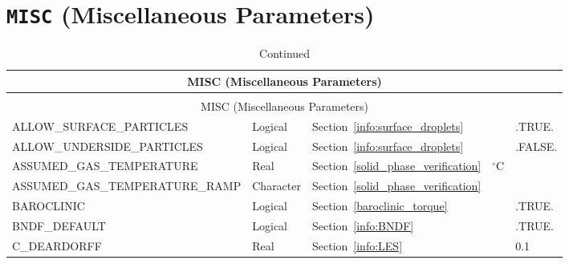 \documentclass[11pt]{book}
\begin{document}
\vspace{\baselineskip}



\section{\texorpdfstring{{\tt MISC}}{MISC} (Miscellaneous Parameters)}


\begin{longtable}{@{\extracolsep{\fill}}|l|l|l|l|l|}
\caption[Miscellaneous parameters ({\ct MISC} namelist group)]{For more information see Section~\ref{info:MISC}.}
\label{tbl:MISC} \\
\hline
\multicolumn{5}{|c|}{{\ct MISC} (Miscellaneous Parameters)} \\
\hline \hline
\endfirsthead
\caption[]{Continued} \\
\hline
\multicolumn{5}{|c|}{{\ct MISC} (Miscellaneous Parameters)} \\
\hline \hline
\endhead
{\ct \footnotesize ALLOW\_SURFACE\_PARTICLES}   & Logical       & Section~\ref{info:surface_droplets}                   &               & {\ct .TRUE.}      \\ \hline
{\ct \footnotesize ALLOW\_UNDERSIDE\_PARTICLES} & Logical       & Section~\ref{info:surface_droplets}                   &               & {\ct .FALSE.}     \\ \hline
{\ct \footnotesize ASSUMED\_GAS\_TEMPERATURE}   & Real          & Section~\ref{solid_phase_verification}                & $^\circ$C     &                   \\ \hline
{\ct \footnotesize ASSUMED\_GAS\_TEMPERATURE\_RAMP}& Character  & Section~\ref{solid_phase_verification}                &               &                   \\ \hline
{\ct BAROCLINIC}                                & Logical       & Section~\ref{baroclinic_torque}                       &               & {\ct .TRUE.}      \\ \hline
{\ct BNDF\_DEFAULT}                             & Logical       & Section~\ref{info:BNDF}                               &               & {\ct .TRUE.}      \\ \hline
{\ct C\_DEARDORFF}                              & Real          & Section~\ref{info:LES}                                &               & 0.1               \\ \hline

\end{longtable}
\end{document}
